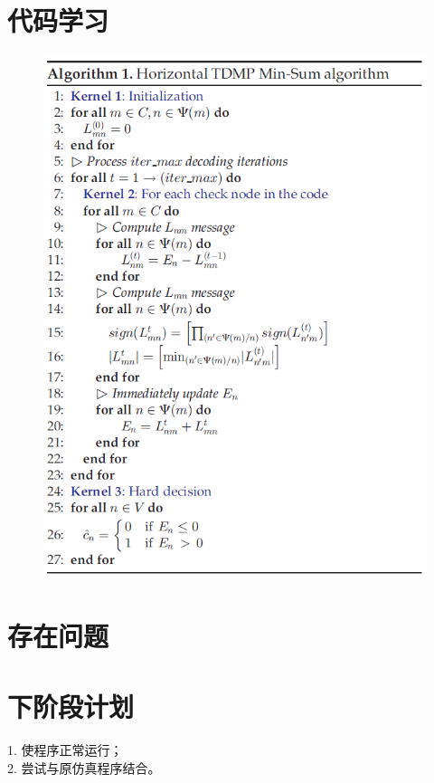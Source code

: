 \documentclass{article}
\begin{document}
\section{代码学习}
\begin{figure}[H]
	\centering
	\includegraphics[width = .6\textwidth]{alg.png}
\end{figure}


\section{存在问题}




\section{下阶段计划}
1. 使程序正常运行；\\
2. 尝试与原仿真程序结合。
\end{document}
